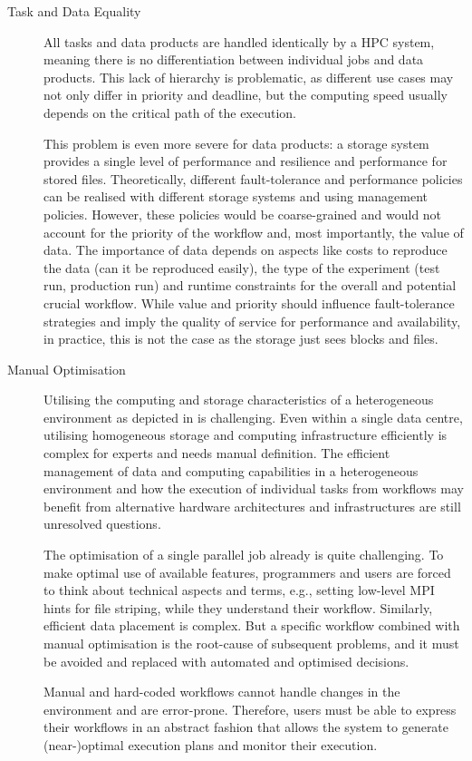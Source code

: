 \documentclass[a4paper]{article}
\begin{document}
\begin{description}
\item[Task and Data Equality]

All tasks and data products are handled identically by a HPC system, meaning there is no differentiation between individual jobs and data products.
This lack of hierarchy is problematic, as different use cases may not only differ in priority and deadline, but the computing speed usually depends on the critical path of the execution.

This problem is even more severe for data products: a storage system provides a single level of performance and resilience and performance for stored files.
Theoretically, different fault-tolerance and performance policies can be realised with different storage systems and using management policies.
However, these policies would be coarse-grained and would not account for the priority of the workflow and, most importantly, the value of data.
The importance of data depends on aspects like costs to reproduce the data (can it be reproduced easily), the type of the experiment (test run, production run) and runtime constraints for the overall and potential crucial workflow.
While value and priority should influence fault-tolerance strategies and imply the quality of service for performance and availability, in practice, this is not the case as the storage just sees blocks and files.

\item[Manual Optimisation]

Utilising the computing and storage characteristics of a heterogeneous environment as depicted in  is challenging.
Even within a single data centre, utilising homogeneous storage and computing infrastructure efficiently is complex for experts and needs manual definition.
The efficient management of data and computing capabilities in a heterogeneous environment and
how the execution of individual tasks from workflows may benefit from alternative hardware architectures and infrastructures
are still unresolved questions.

The optimisation of a single parallel job already is quite challenging.
To make optimal use of available features, programmers and users are forced to think about technical aspects and terms, e.g., setting low-level MPI hints for file striping, while they understand their workflow.
Similarly, efficient data placement is complex. But a specific workflow combined with manual optimisation is the root-cause of subsequent problems, and it must be avoided and replaced with automated and optimised decisions.

Manual and hard-coded workflows cannot handle changes in the environment and are error-prone.
Therefore, users must be able to express their workflows in an abstract fashion that allows the system to generate (near-)optimal execution plans and monitor their execution.

\end{description}
\end{document}
